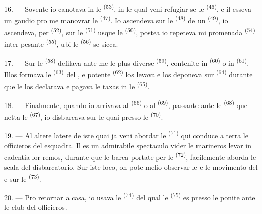 \VUsaut{3.0mm}
\VUsaut{3.0mm}

16. --- Sovente io canotava in le 
\textsuperscript{(53)}, in le qual veni refugiar se le 
\textsuperscript{(46)}, e il esseva un gaudio pro me manovrar le 
\textsuperscript{(47)}. Io ascendeva sur le  \textsuperscript{(48)}
de un  \textsuperscript{(49)}, io ascendeva, per
 \textsuperscript{(52)}, sur le 
\textsuperscript{(51)} usque le  \textsuperscript{(50)}, postea
io repeteva mi promenada  \textsuperscript{(54)} inter
pesante  \textsuperscript{(55)}, ubi le 
\textsuperscript{(56)} se sicca.

17. --- Sur le  \textsuperscript{(58)} defilava ante me le plus
diverse  \textsuperscript{(59)}, contenite in 
\textsuperscript{(60)} o in  \textsuperscript{(61)}.
Illos formava le  \textsuperscript{(63)} del ,
e potente  \textsuperscript{(62)} los levava e los deponeva sur
 \textsuperscript{(64)} durante que le 
los declarava e pagava le taxas in le  \textsuperscript{(65)}.

18. --- Finalmente, quando io arrivava al 
\textsuperscript{(66)} o al  \textsuperscript{(69)}, passante
ante le  \textsuperscript{(68)} que netta le
 \textsuperscript{(67)}, io disbarcava sur le quai presso le
 \textsuperscript{(70)}.

19. --- Al altere latere de iste quai ja veni abordar le 
\textsuperscript{(71)} qui conduce a terra le officieros del esquadra. Il es un
admirabile spectaculo vider le marineros levar in cadentia lor remos, durante
que le barca portate per le  \textsuperscript{(72)}, facilemente
aborda le scala del disbarcatorio. Sur iste loco, on pote melio observar le
 e le movimento del  e  sur le
 \textsuperscript{(73)}.

\VUsaut{3.0mm}
\VUsaut{3.0mm}

20. --- Pro retornar a casa, io usava le 
\textsuperscript{(74)} del qual le  \textsuperscript{(75)} es
presso le  ponite ante le club del officieros.

